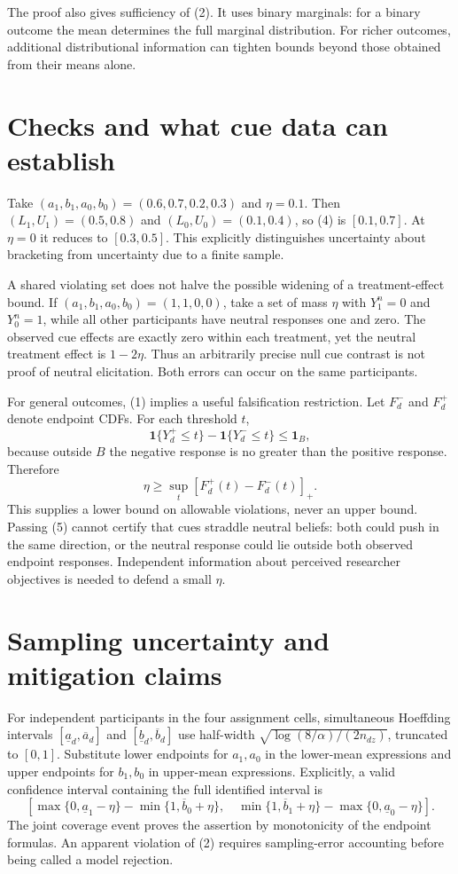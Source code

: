 \documentclass[11pt]{article}
\begin{document}
The proof also gives sufficiency of (2). It uses binary marginals: for a
binary outcome the mean determines the full marginal distribution.
For richer outcomes, additional distributional information can tighten
bounds beyond those obtained from their means alone.

\section{Checks and what cue data can establish}
Take $(a_1,b_1,a_0,b_0)=(0.6,0.7,0.2,0.3)$ and $\eta=0.1$.
Then $(L_1,U_1)=(0.5,0.8)$ and $(L_0,U_0)=(0.1,0.4)$,
so (4) is $[0.1,0.7]$. At $\eta=0$ it reduces to $[0.3,0.5]$.
This explicitly distinguishes uncertainty about bracketing from
uncertainty due to a finite sample.

A shared violating set does not halve the possible widening of a
treatment-effect bound. If $(a_1,b_1,a_0,b_0)=(1,1,0,0)$, take a set
of mass $\eta$ with $Y_1^n=0$ and $Y_0^n=1$, while all other participants
have neutral responses one and zero. The observed cue effects are exactly
zero within each treatment, yet the neutral treatment effect is
$1-2\eta$. Thus an arbitrarily precise null cue contrast is not proof of
neutral elicitation. Both errors can occur on the same participants.

For general outcomes, (1) implies a useful falsification restriction. Let
$F_d^-$ and $F_d^+$ denote endpoint CDFs. For each threshold $t$,
\[
 \mathbf1\{Y_d^+\le t\}-\mathbf1\{Y_d^-\le t\}
 \le\mathbf1_B,
\]
because outside $B$ the negative response is no greater than the positive
response. Therefore
\[
 \eta\ge\sup_t[F_d^+(t)-F_d^-(t)]_+.                     \tag{5}
\]
This supplies a lower bound on allowable violations, never an upper bound.
Passing (5) cannot certify that cues straddle neutral beliefs: both could
push in the same direction, or the neutral response could lie outside
both observed endpoint responses. Independent information about perceived
researcher objectives is needed to defend a small $\eta$.

\section{Sampling uncertainty and mitigation claims}
For independent participants in the four assignment cells, simultaneous
Hoeffding intervals $[\underline a_d,\overline a_d]$ and
$[\underline b_d,\overline b_d]$ use half-width
$\sqrt{\log(8/\alpha)/(2n_{dz})}$, truncated to $[0,1]$.
Substitute lower endpoints for $a_1,a_0$ in the lower-mean expressions
and upper endpoints for $b_1,b_0$ in upper-mean expressions. Explicitly,
a valid confidence interval containing the full identified interval is
\[
 \left[
 \max\{0,\underline a_1-\eta\}-\min\{1,\overline b_0+\eta\},\quad
 \min\{1,\overline b_1+\eta\}-\max\{0,\underline a_0-\eta\}
 \right].                                               \tag{6}
\]
The joint coverage event proves the assertion by monotonicity of the
endpoint formulas. An apparent violation of (2) requires sampling-error
accounting before being called a model rejection.
\end{document}
